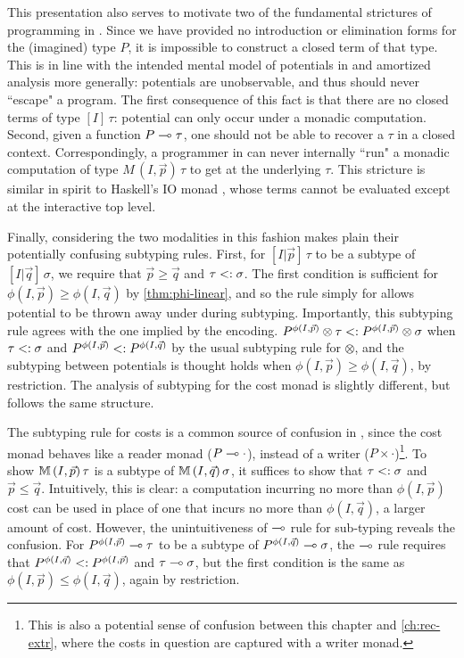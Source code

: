 This presentation also serves to motivate two of the fundamental strictures of programming in \dlambdaamor. Since we have provided no introduction or elimination forms for the (imagined) type $P$, it is impossible to construct a closed term of that type. This is in line with the intended mental model of potentials in \dlambdaamor and amortized analysis more generally: potentials are unobservable, and thus should never ``escape" a program. The first consequence of this fact is that there are no closed terms of type $[I] \, \tau$: potential can only occur under a monadic computation. Second, given a function $P \multimap \tau$, one should not be able to recover a $\tau$ in a closed context. Correspondingly, a programmer in \dlambdaamor can never internally ``run" a monadic computation of type $M \, (I,\vec{p}) \, \tau$ to get at the underlying $\tau$. This stricture is similar in spirit to Haskell's IO monad \citehere, whose terms cannot be evaluated except at the interactive top level. 

Finally, considering the two modalities in this fashion makes plain their potentially confusing subtyping rules. First, for $[I|\vec{p}] \, \tau$ to be a subtype of $[I|\vec{q}] \, \sigma$, we require that $\vec{p} \geq \vec{q}$ and $\tau <: \sigma$. The first condition is sufficient for $\phi(I,\vec{p}) \geq \phi(I,\vec{q})$ by \autoref{thm:phi-linear}, and so the rule simply for allows potential to be thrown away under during subtyping. Importantly, this subtyping rule agrees with the one implied by the encoding. $P^{\phi(I,\vec{p})} \otimes \tau <: P^{\phi(I,\vec{p})} \otimes \sigma$ when $\tau <: \sigma$ and $P^{\phi(I,\vec{p})} <: P^{\phi(I,\vec{q})}$ by the usual subtyping rule for $\otimes$, and the subtyping between potentials is thought holds when $\phi(I,\vec{p}) \geq \phi(I,\vec{q})$, by restriction. The analysis of subtyping for the cost monad is slightly different, but follows the same structure.

The subtyping rule for costs is a common source of confusion in \dlambdaamor, since the cost monad behaves like a reader monad ($P \multimap \cdot$), instead of a writer ($P \times \cdot$)\footnote{
This is also a potential sense of confusion between this chapter and \autoref{ch:rec-extr}, where the costs in question are captured with a writer monad.
}. To show $\mathbb{M} \, (I,\vec{p}) \, \tau$ is a subtype of $\mathbb{M} \, (I,\vec{q}) \, \sigma$, it suffices to show that $\tau <: \sigma$ and $\vec{p} \leq \vec{q}$. Intuitively, this is clear: a computation incurring no more than $\phi(I,\vec{p})$ cost can be used in place of one that incurs no more than $\phi(I,\vec{q})$, a larger amount of cost. However, the unintuitiveness of $\multimap$ rule for sub-typing reveals the confusion. For $P^{\phi(I,\vec{p})} \multimap \tau$ to be a subtype of $P^{\phi(I,\vec{q})} \multimap \sigma$, the $\multimap$ rule requires that $P^{\phi(I,\vec{q})} <: P^{\phi(I,\vec{p})}$ and $\tau \multimap \sigma$, but the first condition is the same as $\phi(I,\vec{p}) \leq \phi(I,\vec{q})$, again by restriction.

